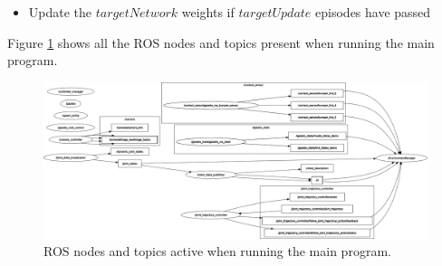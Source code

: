 \documentclass[12pt,oneside]{article}
\begin{document}
\begin{enumerate}
\begin{itemize}
\begin{itemize}
\begin{tcolorbox}[]
\begin{verbatim}
state = nextState
\end{verbatim}
\end{tcolorbox}
			\item Sample experiences from $ReplayMemory$, compute the $currentQValues$ using the $policyNetwork$, and the $targetQValues$ using the $nextQValues$ given by the $targenNetwork$, the discount factor $gamma$, and the $rewards$ taken from the $replayMemory$
\begin{tcolorbox}[]
\begin{verbatim}
experiences = replayMemory.sample(batchSize)
states, actions, rewards, nextStates = extractTensors(experiences)

currentQValues = policyNetwork(states).gather(dim=1, index=actions.unsqueeze(-1))
nextQValues = targetNetwork(nextStates).max(dim=1)[0].detach()
targetQValues = nextQValues * gamma + rewards
\end{verbatim}
\end{tcolorbox}
			\item Compute the loss using mean square error between $currentQValues$ and $targetQValues$ and apply gradient descent to update the weights in the $policyNetwork$.
\begin{tcolorbox}[]
\begin{verbatim}
loss = F.mse_loss(currentQValues, targetQValues.unsqueeze(1))
optimizer.zero_grad()
loss.backward()
optimizer.step()
\end{verbatim}
\end{tcolorbox}
			\item Stop if the $environment.done$ variable is true or if the maximum number of episodes has been reached.
		\end{itemize} 
		\item Update the $targetNetwork$ weights if $targetUpdate$ episodes have passed
	\end{itemize}
\end{enumerate}
Figure \ref{fig:rosgraphlatest} shows all the ROS nodes and topics present when running the main program.
\begin{figure}[H]
\centering
\includegraphics[width=0.99\linewidth]{rosgraph_latest}
\caption{ROS nodes and topics active when running the main program.}
\label{fig:rosgraphlatest}
\end{figure}
\end{document}
